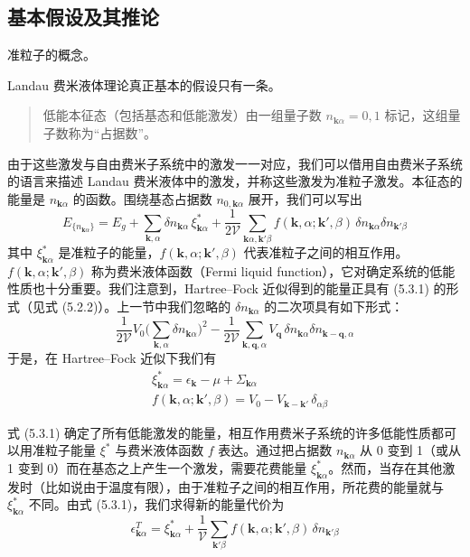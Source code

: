 \subsection{基本假设及其推论}

\begin{keypoints}
\item 准粒子的概念。
\end{keypoints}

Landau 费米液体理论真正基本的假设只有一条。

\begin{quote}
低能本征态（包括基态和低能激发）由一组量子数 $n_{\pmb{k}\alpha}=0,1$ 标记，这组量子数称为“占据数”。
\end{quote}

由于这些激发与自由费米子系统中的激发一一对应，我们可以借用自由费米子系统的语言来描述 Landau 费米液体中的激发，并称这些激发为准粒子激发。本征态的能量是 $n_{\pmb{k}\alpha}$ 的函数。围绕基态占据数 $n_{0,\pmb{k}\alpha}$ 展开，我们可以写出
\begin{equation*}
E_{\{n_{\pmb{k}\alpha}\}} = E_g + \sum_{\pmb{k},\alpha} \delta n_{\pmb{k}\alpha}\, \xi^{*}_{\pmb{k}\alpha} + \frac{1}{2\mathcal{V}} \sum_{\pmb{k}\alpha,\pmb{k}'\beta} f(\pmb{k},\alpha;\pmb{k}',\beta)\, \delta n_{\pmb{k}\alpha} \delta n_{\pmb{k}'\beta} \tag{5.3.1}
\end{equation*}
其中 $\xi^{*}_{\pmb{k}\alpha}$ 是准粒子的能量，$f(\pmb{k},\alpha;\pmb{k}',\beta)$ 代表准粒子之间的相互作用。$f(\pmb{k},\alpha;\pmb{k}',\beta)$ 称为费米液体函数（Fermi liquid function），它对确定系统的低能性质也十分重要。我们注意到，Hartree--Fock 近似得到的能量正具有 (5.3.1) 的形式（见式 (5.2.2)）。上一节中我们忽略的 $\delta n_{\pmb{k}\alpha}$ 的二次项具有如下形式：
\begin{equation*}
\frac{1}{2\mathcal{V}} V_0 \Big( \sum_{\pmb{k},\alpha} \delta n_{\pmb{k}\alpha} \Big)^{2} - \frac{1}{2\mathcal{V}} \sum_{\pmb{k},\pmb{q},\alpha} V_{\pmb{q}}\, \delta n_{\pmb{k}\alpha} \delta n_{\pmb{k}-\pmb{q},\alpha}
\end{equation*}
于是，在 Hartree--Fock 近似下我们有
\begin{align*}
&\xi^{*}_{\pmb{k}\alpha} = \epsilon_{\pmb{k}} - \mu + \Sigma_{\pmb{k}\alpha}\\
&f(\pmb{k},\alpha;\pmb{k}',\beta) = V_0 - V_{\pmb{k}-\pmb{k}'}\, \delta_{\alpha\beta} \tag{5.3.2}
\end{align*}

式 (5.3.1) 确定了所有低能激发的能量，相互作用费米子系统的许多低能性质都可以用准粒子能量 $\xi^{*}$ 与费米液体函数 $f$ 表达。通过把占据数 $n_{\pmb{k}\alpha}$ 从 0 变到 1（或从 1 变到 0）而在基态之上产生一个激发，需要花费能量 $\xi^{*}_{\pmb{k}\alpha}$。然而，当存在其他激发时（比如说由于温度有限），由于准粒子之间的相互作用，所花费的能量就与 $\xi^{*}_{\pmb{k}\alpha}$ 不同。由式 (5.3.1)，我们求得新的能量代价为
\begin{equation*}
\epsilon^{T}_{\pmb{k}\alpha} = \xi^{*}_{\pmb{k}\alpha} + \frac{1}{\mathcal{V}} \sum_{\pmb{k}'\beta} f(\pmb{k},\alpha;\pmb{k}',\beta)\, \delta n_{\pmb{k}'\beta}
\end{equation*}

